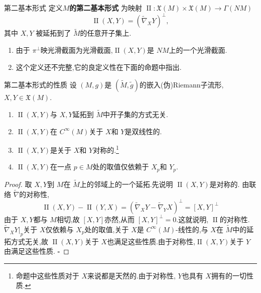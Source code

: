 \documentclass[../../几何与拓扑.tex]{subfiles}
\begin{document}
\begin{definition}{第二基本形式}
    定义\textbf{\(  M  \)的第二基本形式 }为映射 \(  \operatorname{II}: \mathfrak{X}\left( M \right)\times \mathfrak{X}\left( M \right)\to  \Gamma \left( NM \right)     \)  \[
    \operatorname{II}\left( X,Y \right)= \left(  \tilde{\nabla} _{X}Y \right)^{\perp},  
    \]其中 \(  X,Y  \) 被延拓到了 \(  \tilde{M}  \)的任意开子集上.  
\end{definition}
\begin{remark}
    \begin{enumerate}
        \item 由于 \(  \pi ^{\perp}  \)映光滑截面为光滑截面,\(  \operatorname{II}\left( X,Y \right)   \)是 \(  NM  \)上的一个光滑截面.   
        \item 这个定义还不完整,它的良定义性在下面的命题中指出.
    \end{enumerate}
    
\end{remark}

\begin{proposition}{第二基本形式的性质} 
    设 \(  \left( M,g \right)   \)是 \(  \left( \tilde{M},\tilde{g}  \right)   \)的嵌入(伪)Riemann子流形,\(  X,Y\in \mathfrak{X}\left( M \right)   \).
    \begin{enumerate}
        \item \(  \operatorname{II}\left( X,Y \right)   \)与 \(  X,Y  \)延拓到 \(  \tilde{M}  \)中开子集的方式无关.
        \item \(  \operatorname{II}\left( X,Y \right)   \)在 \(  C^{\infty}\left( M \right)   \)关于 \(  X  \)和 \(  Y  \)是双线性的.
        \item \(  \operatorname{II}\left( X,Y \right)   \)是关于 \(  X  \)和 \(  Y  \)对称的.\footnote{命题中这些性质对于 \(  X  \)来说都是天然的.由于对称性, \(  Y  \)也具有 \(  X  \)拥有的一切性质.  }
        \item \label{enum-1-4}\(  \operatorname{II}\left( X,Y \right)   \)在一点 \(  p \in M  \)处的取值仅依赖于 \(  X_{p}  \)和 \(  Y_{p}  \).     
    \end{enumerate}
       
    
\end{proposition}


\begin{proof}
    取 \(  X,Y  \)到 \(  M  \)在 \(  \tilde{M}  \)上的邻域上的一个延拓.先说明 \(  \operatorname{II}\left( X,Y \right)   \)是对称的.  由联络 \(   \tilde{\nabla}   \)的对称性,   \[
    \operatorname{II}\left( X,Y \right)-\operatorname{II}\left( Y,X \right)= \left(  \tilde{\nabla} _{X}Y- \tilde{\nabla} _{Y}X \right)^{\perp}= \left[ X,Y \right]^{\perp}    
    \] 由于 \(  X,Y  \)都与 \(  M  \)相切,故 \(  \left[ X,Y \right]   \)亦然,从而 \(  \left[ X,Y \right]^{\perp}= 0   \).这就说明, \(  \operatorname{II}  \)的对称性.
  \(   \tilde{\nabla} _{X}Y|_{p}  \)关于 \(  X  \)仅依赖与 \(  X_{p}  \)处的取值,关于 \(  X  \)是 \(  C^{\infty}\left( M \right)   \)-线性的,与 \(  X  \)在 \(  \tilde{M}  \)中的延拓方式无关,故 \(  \operatorname{II}\left( X,Y \right)   \)关于 \(  X  \)也满足这些性质.由于对称性,\(  \operatorname{II}\left( X,Y \right)   \)关于 \(  Y  \)由满足这些性质.           
    \hfill $\square$
\end{proof}
    
\end{document}
